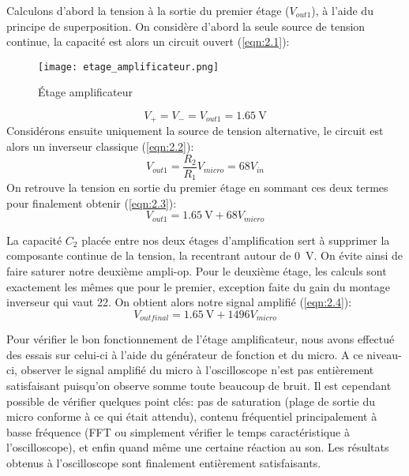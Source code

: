 Calculons d'abord la tension à la sortie du premier étage ($V_{out 1}$), à l'aide du principe de superposition. On considère d'abord la seule source de tension continue, la capacité est alors un circuit ouvert (\ref{eqn:2.1}):
\begin{figure}[htbp]
\centering
\texttt{[image: etage\_amplificateur.png]}
\caption{Étage amplificateur}
\label{fig:etage amplificateur}
\end{figure}
\begin{equation}
V_{+} = V_{-} = V_{out 1} = \SI{1.65}{\volt}
\label{eqn:2.1}
\end{equation}
Considérons ensuite uniquement la source de tension alternative, le circuit est alors un inverseur classique (\ref{eqn:2.2}):
\begin{equation}
V_{out 1} = \frac{R_2}{R_1} V_{micro} = 68 V_{in}
\label{eqn:2.2}
\end{equation}
On retrouve la tension en sortie du premier étage en sommant ces deux termes pour finalement obtenir (\ref{eqn:2.3}):
\begin{equation}
V_{out 1} = \SI{1.65}{\volt} + 68 V_{micro}
\label{eqn:2.3}
\end{equation}

La capacité $C_{2}$ placée entre nos deux étages d'amplification sert à supprimer la composante continue de la tension, la recentrant autour de \SI{0}{\volt}. On évite ainsi de faire saturer notre deuxième ampli-op. Pour le deuxième étage, les calculs sont exactement les mêmes que pour le premier, exception faite du gain du montage inverseur qui vaut 22. On obtient alors notre signal amplifié (\ref{eqn:2.4}):
\begin{equation}
V_{out final} = \SI{1.65}{\volt} + 1496 V_{micro}
\label{eqn:2.4}
\end{equation}

Pour vérifier le bon fonctionnement de l'étage amplificateur, nous avons effectué des essais sur celui-ci à l'aide du générateur de fonction et du micro. A ce niveau-ci, observer le signal amplifié du micro à l'oscilloscope n'est pas entièrement satisfaisant puisqu'on observe somme toute beaucoup de bruit. Il est cependant possible de vérifier quelques point clés: pas de saturation (plage de sortie du micro conforme à ce qui était attendu), contenu fréquentiel principalement à basse fréquence (FFT ou simplement vérifier le temps caractéristique à l'oscilloscope), et enfin quand même une certaine réaction au son. Les résultats obtenus à l'oscilloscope sont finalement entièrement satisfaisants.

